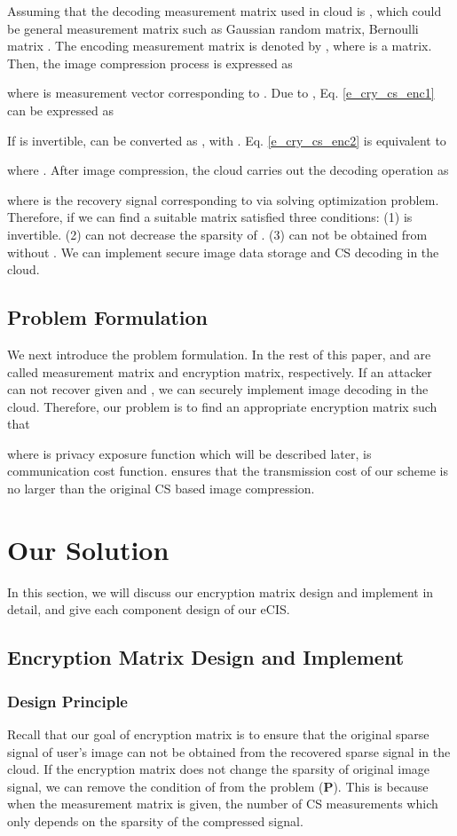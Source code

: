 \documentclass[conference]{IEEEtran}
\begin{document}
Assuming that the decoding measurement matrix used in cloud is , which could be general measurement matrix such as Gaussian random matrix,  Bernoulli matrix \cite{candes2006robust}. The encoding measurement matrix is denoted by , where  is a  matrix. Then, the image compression process is expressed as

where  is measurement vector corresponding to . Due to , Eq. \ref{e_cry_cs_enc1} can be expressed as

If  is invertible,  can be converted as , with .  Eq. \ref{e_cry_cs_enc2} is equivalent to

where  . After image compression, the cloud carries out the decoding operation as

where  is the recovery signal corresponding to  via solving  optimization problem.
Therefore, if we can find a suitable matrix  satisfied three conditions: (1)  is invertible. (2)  can not decrease the sparsity of . (3)  can not be obtained from  without . We can implement secure image data storage and CS decoding in the cloud.

\subsection{Problem Formulation}
We next introduce the problem formulation. In the rest of this paper,  and  are called measurement matrix and encryption matrix, respectively. If an attacker can not recover  given  and , we can securely implement image decoding in the cloud. Therefore, our problem is to find an appropriate encryption matrix  such that

where  is privacy exposure function which will be described later,  is communication cost function.   ensures  that the transmission cost of our scheme is no larger than the original CS based image compression. 
\section{Our Solution}
In this section, we will discuss our encryption matrix design and implement in detail, and give each component design of our eCIS.
\subsection{Encryption Matrix Design and Implement}
\subsubsection{Design Principle}Recall that our goal of encryption matrix is to ensure that the original sparse signal of user's image can not be obtained from the recovered sparse signal in the cloud. If the encryption matrix does not change the sparsity of original image signal, we can remove the condition of  from the problem (\textbf{P}). This is because when the measurement matrix is given, the number of CS measurements which  only depends on the sparsity of the compressed signal.
\end{document}

